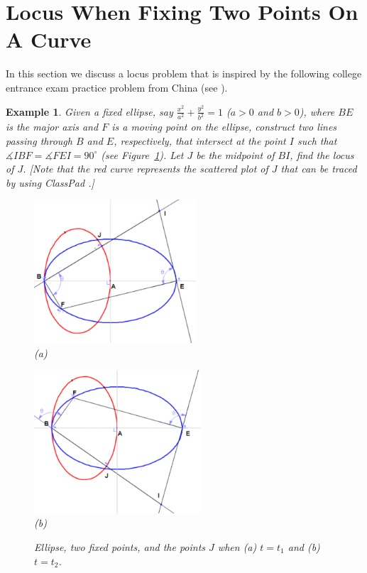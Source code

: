 \documentclass[12pt,a4paper]{article}%
\newtheorem{example}[theorem]{Example}
\begin{document}
\section{Locus When Fixing Two Points On A Curve} \label{sec4}

In this section we discuss a locus problem that is inspired by the following
college entrance exam practice problem from China (see \cite{Gao}).

\begin{example} \label{ex8}
Given a fixed ellipse, say $\frac{x^{2}}{a^{2}}+\frac{y^{2}}{b^{2}}=1$
($a>0$ and $b>0$),
where $BE$ is the major axis and $F$ is a moving point on the ellipse,
construct two lines passing through $B$ and $E$, respectively, that
intersect at the point $I$ such that
$\measuredangle IBF=\measuredangle FEI=90^{\circ}$ (see Figure~\ref{fig10}).
Let $J$ be the midpoint of $BI$, find the locus of $J$.
[Note that the red curve represents the scattered plot of $J$
that can be traced by using ClassPad \cite{CP}.]%

\begin{figure}[htpb]
\begin{center}
\parbox[b]{2.4in}{\begin{center}
\includegraphics[height=2.1in,keepaspectratio]{PJH75H1I.pdf}
 \\ (a)
\end{center}}
\qquad
\parbox[b]{2.4in}{\begin{center}
\includegraphics[height=2.1in,keepaspectratio]{PJH75H1J.pdf}
 \\ (b)
\end{center}}
\end{center}
\caption{Ellipse, two fixed points, and the points $J$
         when (a) $t=t_1$ and (b) $t=t_2$.}
\label{fig10}
\end{figure}
\end{example}
\end{document}
